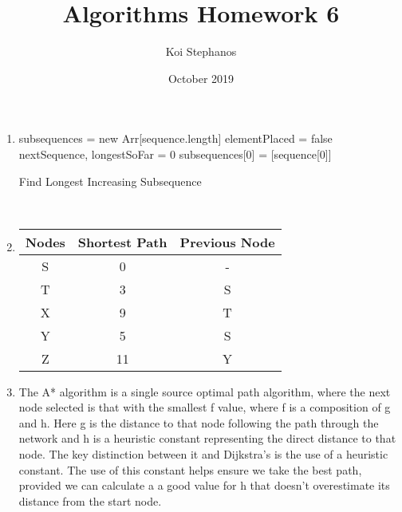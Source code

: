 \documentclass{article}
\title{Algorithms Homework 6}
\author{Koi Stephanos}
\date{October 2019}
\begin{document}
\maketitle

\begin{enumerate}
\item

    \hspace*{.5em}\begin{minipage}{.99\linewidth}
            \begin{algorithm}[H]
            \SetAlgoLined
            \BlankLine
            subsequences = new Arr[sequence.length]\;
            elementPlaced = false\;
            nextSequence, longestSoFar = 0\;
            subsequences[0] = [sequence[0]]\;
            \BlankLine
            \caption{Find Longest Increasing Subsequence}
            \end{algorithm}
            \end{minipage}
\\[\medskipamount]
\item
        \hspace*{7em}\begin{tabular}[h]{|c|c|c|}
        \hline
             Nodes & Shortest Path & Previous Node  \\
        \hline
                S    &   0   &   -\\
        \hline
                T    &   3   &   S\\
        \hline
                X    &   9   &   T\\
        \hline
                Y    &   5   &   S\\
        \hline
                Z    &   11  &   Y\\
        \hline
        \end{tabular}
        \label{tab:my_label}
\pagebreak
\item
    The A* algorithm is a single source optimal path algorithm, where the next node selected is that with the smallest f value, where f is a composition of g and h. Here g is the distance to that node following the path through the network and h is a heuristic constant representing the direct distance to that node. The key distinction between it and Dijkstra's is the use of a heuristic constant. The use of this constant helps ensure we take the best path, provided we can calculate a a good value for h that doesn't overestimate its distance from the start node.


\end{enumerate}
\end{document}
